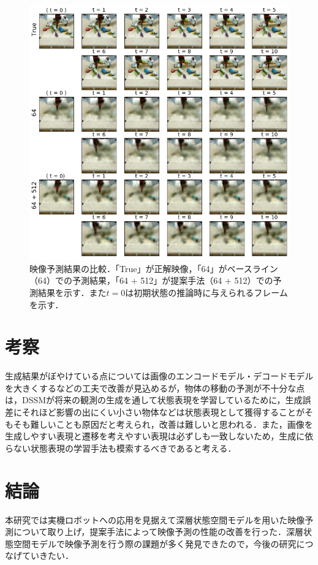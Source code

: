 \documentclass[10pt, twocolumn]{jarticle}
\begin{document}
\begin{figure}[h]
  \begin{center}
      \includegraphics[width=0.75\linewidth]{./figures/pred_a.png}
      \caption[映像予測結果の比較]{\small 映像予測結果の比較．「True」が正解映像，「64」がベースライン（64）での予測結果，「64 + 512」が提案手法（64 + 512）での予測結果を示す．また$t = 0$は初期状態の推論時に与えられるフレームを示す．}
      \label{fig:pred_a}
  \end{center}
  \end{figure}
\normalsize

\section{考察}
生成結果がぼやけている点については画像のエンコードモデル・デコードモデルを大きくするなどの工夫で改善が見込めるが，物体の移動の予測が不十分な点は，DSSMが将来の観測の生成を通して状態表現を学習しているために，生成誤差にそれほど影響の出にくい小さい物体などは状態表現として獲得することがそもそも難しいことも原因だと考えられ，改善は難しいと思われる．また，画像を生成しやすい表現と遷移を考えやすい表現は必ずしも一致しないため，生成に依らない状態表現の学習手法も模索するべきであると考える．

\section{結論}

本研究では実機ロボットへの応用を見据えて深層状態空間モデルを用いた映像予測について取り上げ，提案手法によって映像予測の性能の改善を行った．深層状態空間モデルで映像予測を行う際の課題が多く発見できたので，今後の研究につなげていきたい．



\end{document}
